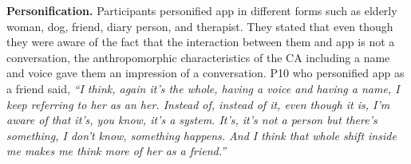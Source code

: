  
            \textbf{Personification. }
            Participants personified \acl{app} in different forms such as elderly woman, dog, friend, diary person, and therapist.
            They stated that even though they were aware of the fact that the interaction between them and \acl{app} is not a conversation, the anthropomorphic characteristics of the \ac{CA} including a name and voice gave them an impression of a conversation.
            P10 who personified \acl{app} as a friend said,
                \textit{``I think, again it's the whole, having a voice and having a name, I keep referring to her as an her. Instead of, instead of it, even though it is, I'm aware of that it's, you know, it's a system. It's, it's not a person but there's something, I don't know, something happens. And I think that whole shift inside me makes me think more of her as a friend.''}

